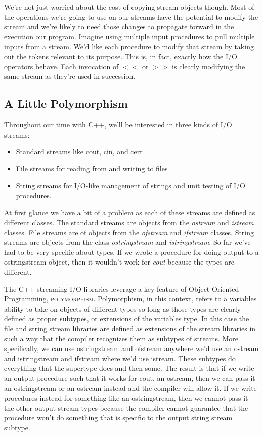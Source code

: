 \documentclass[]{tufte-handout}
\begin{document}
We're not just worried about the cost of copying stream objects though. Most of the operations we're going to use on our streams have the potential to modify the stream and we're likely to need those changes to propagate forward in the execution our program. Imagine using multiple input procedures to pull multiple inputs from a stream. We'd like each procedure to modify that stream by taking out the tokens relevant to its purpose. This is, in fact, exactly how the I/O operators behave. Each invocation of $<<$ or $>>$ is clearly modifying the same stream as they're used in succession. 


\subsection{A Little Polymorphism}

Throughout our time with C++, we'll be interested in three kinds of I/O streams:
\begin{itemize}
\item Standard streams like cout, cin, and cerr
\item File streams for reading from and writing to files
\item String streams for I/O-like management of strings and unit testing of I/O procedures.
\end{itemize}
At first glance we have a bit of a problem as each of these streams are defined as different classes. The standard streams are objects from the \textit{ostream} and \textit{istream} classes.  File streams are of objects from the \textit{ofstream} and \textit{ifstream} classes. String streams are objects from the class \textit{ostringstream} and \textit{istringstream}. 
So far we've had to be very specific about types.  If we wrote a procedure for doing output to a ostringstream object, then it wouldn't work for \textit{cout} because the types are different. 

The C++ streaming I/O libraries leverage a key feature of Object-Oriented Programming, \textsc{polymorphism}.  Polymorphism, in this context, refers to a variables ability to take on objects of different types so long as those types are clearly defined as proper subtypes, or extensions of the variables type. In this case the file and string stream libraries are defined as extensions of the stream libraries in such a way that the compiler recognizes them as subtypes of streams. More specifically, we can use ostringstream and ofstream anywhere we'd use an ostream and istringstream and ifstream where we'd use istream. These subtypes do everything that the supertype does and then some. 
The result is that if we write an output procedure such that it works for cout, an ostream, then we can pass it an ostringstream or an ostream instead and the compiler will allow it. If we write procedures instead for something like an ostringstream, then we cannot pass it the other output stream types because the compiler cannot guarantee that the procedure won't do something that is specific to the output string stream subtype. 
\end{document}
